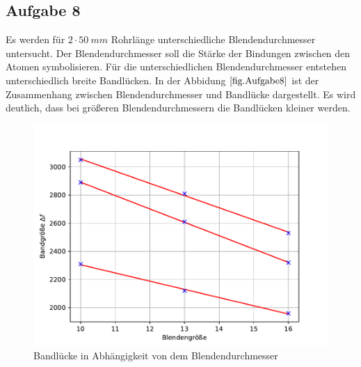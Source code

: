 \subsection{Aufgabe 8}
Es werden für $2 \cdot \SI{50}{mm}$ Rohrlänge unterschiedliche Blendendurchmesser untersucht. Der Blendendurchmesser soll die Stärke der Bindungen zwischen den Atomen symbolisieren.
Für die unterschiedlichen Blendendurchmesser entstehen unterschiedlich breite Bandlücken.
In der Abbidung $\ref{fig.Aufgabe8}$ ist der Zusammenhang zwischen Blendendurchmesser und Bandlücke dargestellt.
Es wird deutlich, dass bei größeren Blendendurchmessern die Bandlücken kleiner werden.
\begin{figure}[h!]
  \centering
  \includegraphics[width=\textwidth]{A8.pdf}
  \caption{Bandlücke in Abhängigkeit von dem Blendendurchmesser}
  \label{fig.Aufgabe8}
\end{figure}
\FloatBarrier

